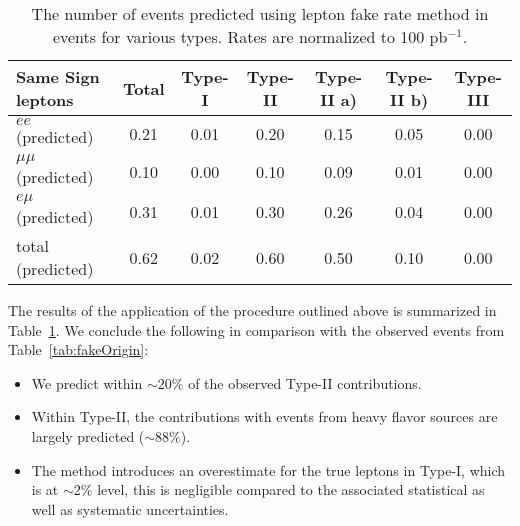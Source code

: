 \vspace{2mm}
\begin{table}[hbt]
\begin{center}
\begin{tabular}{|l|c|c|c|c|c|c|}\hline
Same Sign leptons & Total &      Type-I &  Type-II & Type-II a) & Type-II b) & Type-III \\ \hline
$ee$ (predicted) &	0.21 &	0.01 &	0.20 &	0.15 &	0.05 &	0.00 \\
$\mu\mu$ (predicted) &	0.10 &	0.00 &	0.10 &	0.09 &	0.01 &	0.00 \\
$e\mu$ (predicted) &	0.31 &	0.01 &	0.30 &	0.26 &	0.04 &	0.00 \\
total (predicted) &	0.62 &	0.02 &	0.60 &	0.50 &	0.10 &	0.00 \\
\hline
\end{tabular}
\caption{ The number of events predicted using lepton fake rate method in \ttbar events for various types. 
Rates are normalized to 100 pb$^{-1}$.\label{tab:LeptonFakePredict}}
\end{center}
\end{table}
 The results of the application of the procedure outlined above is summarized in Table~\ref{tab:LeptonFakePredict}. 
We conclude the following in comparison with the observed events from Table~\ref{tab:fakeOrigin}:


\begin{itemize}
\item We predict within $\sim 20 \%$ of the observed Type-II contributions.
\item Within Type-II, the contributions with events from heavy flavor sources are largely predicted ($\sim 88 \%$).
\item The method introduces an overestimate for the true leptons in Type-I, which is at $\sim 2 \%$ level, 
this is negligible compared to the associated statistical as well as systematic uncertainties.
\end{itemize}
